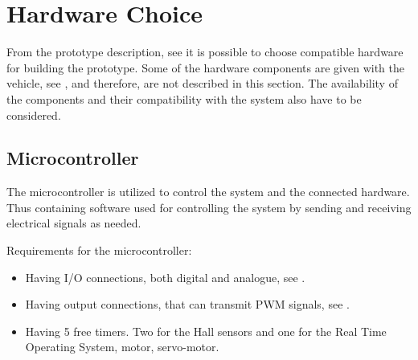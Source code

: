 \section{Hardware Choice} \label{Hardwarechoice}
From the prototype description, see  it is possible to choose compatible hardware for building the prototype. 
Some of the hardware components are given with the vehicle, see , and therefore, are not described in this section. 
The availability of the components and their compatibility with the system also have to be considered.


\subsection{Microcontroller}
The microcontroller is utilized to control the system and the connected hardware. Thus containing software used for controlling the system by sending and receiving electrical signals as needed.

Requirements for the microcontroller:
\begin{itemize}
\item Having I/O connections, both digital and analogue, see .
\item Having output connections, that can transmit PWM signals, see .
\item Having 5 free timers. Two for the Hall sensors and one for the Real Time Operating System, motor, servo-motor.
\end{itemize}

